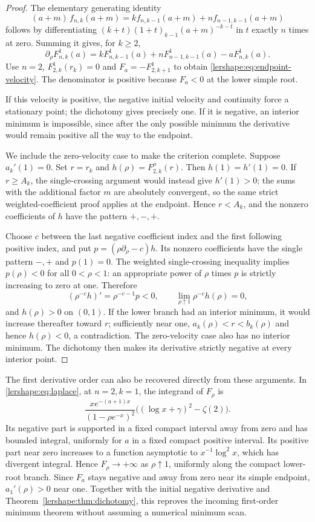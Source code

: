 \begin{proof}
The elementary generating identity
\[
 (a+m)\,f_{n,k}(a+m)
 =k f_{n,k-1}(a+m)+n f_{n-1,k-1}(a+m)
\]
follows by differentiating $(k+t)(1+t)_{k-1}(a+m)^{-k-t}$ in
$t$ exactly $n$ times at zero. Summing it gives, for $k\geq2$,
\begin{equation}\label{lershape:eq:rho-endpoint}
 \partial_\rho F_{n,k}^{1}(a)
 =kF_{n,k-1}^{1}(a)+nF_{n-1,k-1}^{1}(a)-aF_{n,k}^{1}(a).
\end{equation}
Use $n=2$, $F_{2,k}^{1}(r_k)=0$ and
$F_a=-F_{2,k+1}^{1}$ to obtain
\eqref{lershape:eq:endpoint-velocity}. The denominator is positive
because $F_a<0$ at the lower simple root.

If this velocity is positive, the negative initial velocity and
continuity force a stationary point; the dichotomy gives precisely one.
If it is negative, an interior minimum is impossible, since after the
only possible minimum the derivative would remain positive all the way
to the endpoint.

We include the zero-velocity case to make the criterion complete.
Suppose $a_k'(1)=0$. Set $r=r_k$ and $h(\rho)=F_{2,k}^{\rho}(r)$.
Then $h(1)=h'(1)=0$. If $r\geq A_k$, the single-crossing argument
would instead give $h'(1)>0$; the sums with the additional factor $m$
are absolutely convergent, so the same strict weighted-coefficient
proof applies at the endpoint. Hence $r<A_k$, and the nonzero
coefficients of $h$ have the pattern $+,-,+$.

Choose $c$ between the last negative coefficient index and the first
following positive index, and put $p=(\rho\partial_\rho-c)h$.
Its nonzero coefficients have the single pattern $-,+$ and
$p(1)=0$. The weighted single-crossing inequality implies
$p(\rho)<0$ for all $0<\rho<1$: an appropriate power of $\rho$
times $p$ is strictly increasing to zero at one. Therefore
\[
 (\rho^{-c}h)'=\rho^{-c-1}p<0,
 \qquad \lim_{\rho\uparrow1}\rho^{-c}h(\rho)=0,
\]
and $h(\rho)>0$ on $(0,1)$. If the lower branch had an interior
minimum, it would increase thereafter toward $r$; sufficiently near
one, $a_k(\rho)<r<b_k(\rho)$ and hence $h(\rho)<0$, a contradiction.
The zero-velocity case also has no interior minimum. The dichotomy
then makes its derivative strictly negative at every interior point.
\end{proof}

The first derivative order can also be recovered directly from these
arguments. In \eqref{lershape:eq:laplace}, at $n=2,k=1$, the integrand
of $F_\rho$ is
\[
 \frac{x e^{-(a+1)x}}{(1-\rho e^{-x})^2}
 \bigl((\log x+\gamma)^2-\zeta(2)\bigr).
\]
Its negative part is supported in a fixed compact interval away from
zero and has bounded integral, uniformly for $a$ in a fixed compact
positive interval. Its positive part near zero increases to a function
asymptotic to $x^{-1}\log^2 x$, which has divergent integral. Hence
$F_\rho\to+\infty$ as $\rho\uparrow1$, uniformly along the compact
lower-root branch. Since $F_a$ stays negative and away from zero near
its simple endpoint, $a_1'(\rho)>0$ near one. Together with the initial
negative derivative and Theorem~\ref{lershape:thm:dichotomy}, this
reproves the incoming first-order minimum theorem without assuming a
numerical minimum scan.

